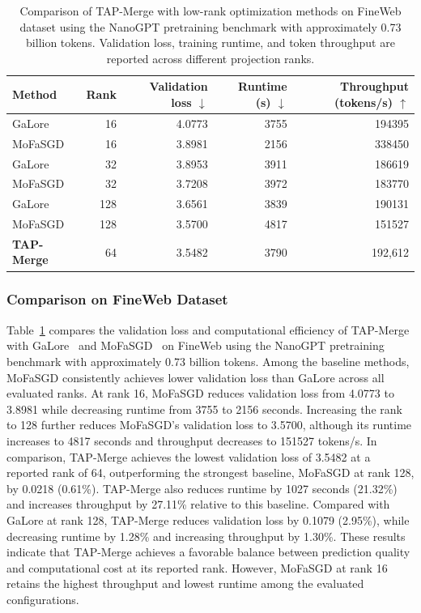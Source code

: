 \documentclass[fleqn,10pt]{wlscirep}
\begin{document}
\begin{table}[t]
\centering\small
\caption{Comparison of TAP-Merge with low-rank optimization
methods on FineWeb dataset using the NanoGPT pretraining benchmark
with approximately 0.73 billion tokens. Validation loss,
training runtime, and token throughput are reported across
different projection ranks.}
\label{tab:fineweb_native}
\begin{tabular}{lrrrr}
\toprule
Method & Rank & Validation loss $\downarrow$ & Runtime (s) $\downarrow$
& Throughput (tokens/s) $\uparrow$\\
\midrule
GaLore~\cite{galore2024} & 16 & 4.0773 & 3755 & 194395\\
MoFaSGD~\cite{mofasgd2025} & 16 & 3.8981 & 2156 & 338450\\
GaLore~\cite{galore2024} & 32 & 3.8953 & 3911 & 186619\\
MoFaSGD~\cite{mofasgd2025} & 32 & 3.7208 & 3972 & 183770\\
GaLore~\cite{galore2024} & 128 & 3.6561 & 3839 & 190131\\
MoFaSGD~\cite{mofasgd2025} & 128 & 3.5700 & 4817 & 151527\\
\midrule
\textbf{TAP-Merge} & 64 & 3.5482 & 3790 & 192{,}612\\ \bottomrule
\end{tabular}
\end{table}



\subsubsection{Comparison on FineWeb Dataset}
\label{subsec:performance_fineweb}
Table~\ref{tab:fineweb_native} compares the validation loss and computational efficiency of TAP-Merge with GaLore~\cite{galore2024} and MoFaSGD~\cite{mofasgd2025} on FineWeb using the NanoGPT pretraining benchmark with approximately 0.73 billion tokens. Among the baseline methods, MoFaSGD consistently achieves lower validation loss than GaLore across all evaluated ranks. At rank 16, MoFaSGD reduces validation loss from 4.0773 to 3.8981 while decreasing runtime from 3755 to 2156 seconds. Increasing the rank to 128 further reduces MoFaSGD's validation loss to 3.5700, although its runtime increases to 4817 seconds and throughput decreases to 151527 tokens/s. In comparison, TAP-Merge achieves the lowest validation loss of 3.5482 at a reported rank of 64, outperforming the strongest baseline, MoFaSGD at rank 128, by 0.0218 (0.61\%). TAP-Merge also reduces runtime by 1027 seconds (21.32\%) and increases throughput by 27.11\% relative to this baseline. Compared with GaLore at rank 128, TAP-Merge reduces validation loss by 0.1079 (2.95\%), while decreasing runtime by 1.28\% and increasing throughput by 1.30\%. These results indicate that TAP-Merge achieves a favorable balance between prediction quality and computational cost at its reported rank. However, MoFaSGD at rank 16 retains the highest throughput and lowest runtime among the evaluated configurations. 
\end{document}

